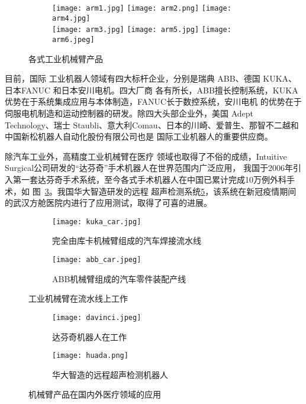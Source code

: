 \begin{figure}
\centering
\begin{subfigure}{1.\textwidth}
  \centering
  \texttt{[image: arm1.jpg]}
  \texttt{[image: arm2.png]}
  \texttt{[image: arm4.jpg]}\\
  \texttt{[image: arm3.jpg]}
  \texttt{[image: arm5.jpg]}
  \texttt{[image: arm6.jpeg]}
\end{subfigure}%
\caption{各式工业机械臂产品}
\label{fig:arms}
\end{figure}


目前，国际
工业机器人领域有四大标杆企业，分别是瑞典 ABB、德国 KUKA、日本FANUC 和日本安川电机。四大厂商
各有所长，ABB擅长控制系统，KUKA优势在于系统集成应用与本体制造，FANUC长于数控系统，安川电机
的优势在于伺服电机制造和运动控制器的研发。除四大头部企业外，美国 Adept Technology、瑞士
Staubli、意大利Comau、日本的川崎、爱普生、那智不二越和中国新松机器人自动化股份有限公司也是
国际工业机器人的重要供应商\cite{huangxihuanReview}。

除汽车工业外，高精度工业机械臂在医疗
领域也取得了不俗的成绩，Intuitive Surgical公司研发的“达芬奇”手术机器人在世界范围内广泛应用，
我国于2006年引入第一套达芬奇手术系统，至今各式手术机器人在中国已累计完成10万例外科手术，如
图~\ref{fig:davinci}。我国华大智造研发的远程
超声检测系统\ref{fig:huada}，该系统在新冠疫情期间的武汉方舱医院内进行了应用测试\cite{wushengzheng20205g}，取得了可喜的进展。


\begin{figure}
\centering
\begin{subfigure}{.5\textwidth}
  \centering
  \texttt{[image: kuka\_car.jpg]}
  \caption{完全由库卡机械臂组成的汽车焊接流水线}
\end{subfigure}%
\begin{subfigure}{.5\textwidth}
  \centering
  \texttt{[image: abb\_car.jpeg]}
  \caption{ABB机械臂组成的汽车零件装配产线}
\end{subfigure}
\caption{工业机械臂在流水线上工作}
\label{fig:armcar}
\end{figure}

\begin{figure}
\centering
\begin{subfigure}{.5\textwidth}
  \centering
  \texttt{[image: davinci.jpeg]}
  \caption{达芬奇机器人在工作}
  \label{fig:davinci}
\end{subfigure}%
\begin{subfigure}{.5\textwidth}
  \centering
  \texttt{[image: huada.png]}
  \caption{华大智造的远程超声检测机器人}
  \label{fig:huada}
\end{subfigure}%
\caption{机械臂产品在国内外医疗领域的应用}
\end{figure}



